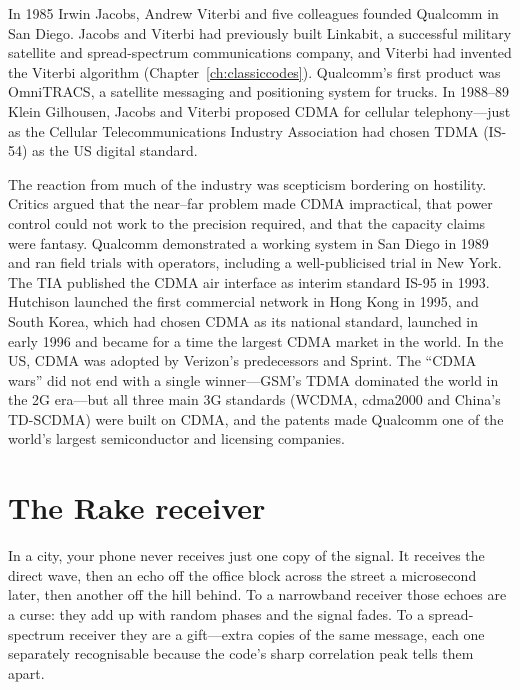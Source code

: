 \begin{history}
In 1985 Irwin Jacobs, Andrew Viterbi and five colleagues founded Qualcomm in San Diego. Jacobs
and Viterbi had previously built Linkabit, a successful military satellite and spread-spectrum
communications company, and Viterbi had invented the Viterbi algorithm
(Chapter~\ref{ch:classiccodes}). Qualcomm's first product was OmniTRACS, a satellite messaging
and positioning system for trucks. In 1988--89 Klein Gilhousen, Jacobs and Viterbi proposed
CDMA for cellular telephony---just as the Cellular Telecommunications Industry Association
had chosen TDMA (IS-54) as the US digital standard.

The reaction from much of the industry was scepticism bordering on hostility. Critics argued
that the near--far problem made CDMA impractical, that power control could not work to the
precision required, and that the capacity claims were fantasy. Qualcomm demonstrated a
working system in San Diego in 1989 and ran field trials with operators, including a
well-publicised trial in New York. The TIA published the CDMA air interface as interim
standard IS-95 in 1993. Hutchison launched the first commercial network in Hong Kong in
1995, and South Korea, which had chosen CDMA as its national standard, launched in early
1996 and became for a time the largest CDMA market in the world. In the US, CDMA was adopted
by Verizon's predecessors and Sprint. The ``CDMA wars'' did not end with a single winner---GSM's
TDMA dominated the world in the 2G era---but all three main 3G standards (WCDMA, cdma2000 and
China's TD-SCDMA) were built on CDMA, and the patents made Qualcomm one of the world's largest
semiconductor and licensing companies.
\end{history}

\section{The Rake receiver}
\label{sec:ch18:rake}

In a city, your phone never receives just one copy of the signal. It receives the direct wave,
then an echo off the office block across the street a microsecond later, then another off the
hill behind. To a narrowband receiver those echoes are a curse: they add up with random phases and
the signal fades. To a spread-spectrum receiver they are a gift---extra copies of the same
message, each one separately recognisable because the code's sharp correlation peak tells them
apart.

